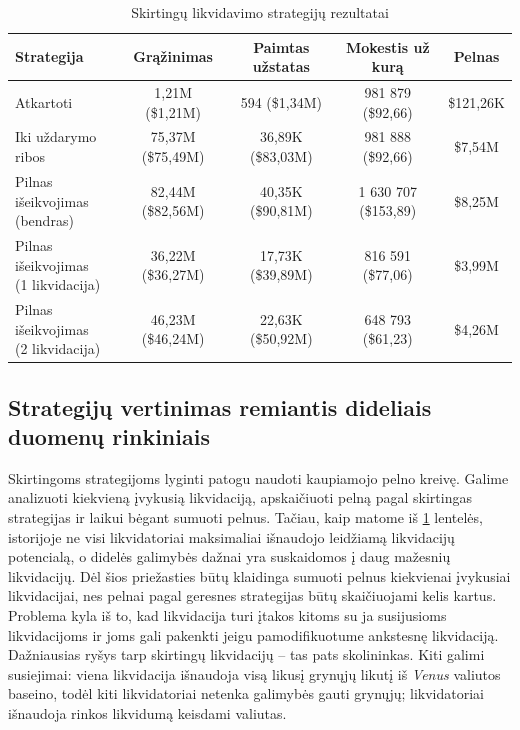 \documentclass{VUMIFPSkursinis}
\begin{document}
\begin{table}[h!]
  \centering
  \begin{tabular}{|l|c|c|c|c|}
  \hline
  \textbf{Strategija}                & \textbf{Grąžinimas}    & \textbf{Paimtas užstatas}   & \textbf{Mokestis už kurą}            & \textbf{Pelnas}              \\ \hline
  Atkartoti                         & 1,21M (\$1,21M)         & 594 (\$1,34M)                & 981 879 (\$92,66)            & \$121,26K                    \\ \hline
  Iki uždarymo ribos                   & 75,37M (\$75,49M)       & 36,89K (\$83,03M)            & 981 888 (\$92,66)            & \$7,54M                      \\ \hline
  \makecell[cl]{Pilnas išeikvojimas \\ (bendras)}                   & 82,44M (\$82,56M)       & 40,35K (\$90,81M)            & 1 630 707 (\$153,89)         & \$8,25M                      \\ \hline
  \makecell[cl]{Pilnas išeikvojimas \\ (1 likvidacija)}                         & 36,22M (\$36,27M)       & 17,73K (\$39,89M)            & 816 591 (\$77,06)            & \$3,99M                      \\ \hline
  \makecell[cl]{Pilnas išeikvojimas \\ (2 likvidacija)}                        & 46,23M (\$46,24M)       & 22,63K (\$50,92M)            & 648 793 (\$61,23)            & \$4,26M                      \\ \hline
  \end{tabular}
  \caption{Skirtingų likvidavimo strategijų rezultatai}
  \label{liquidation_example_comp}
  \end{table}

\subsection{Strategijų vertinimas remiantis dideliais duomenų rinkiniais}
\label{sec:lyginimas_daug}

Skirtingoms strategijoms lyginti patogu naudoti kaupiamojo pelno kreivę. Galime analizuoti kiekvieną įvykusią likvidaciją, apskaičiuoti pelną pagal skirtingas strategijas ir laikui bėgant sumuoti pelnus. Tačiau, kaip matome iš \ref{liquidation_example_comp} lentelės, istorijoje ne visi likvidatoriai maksimaliai išnaudojo leidžiamą likvidacijų potencialą, o didelės galimybės dažnai yra suskaidomos į daug mažesnių likvidacijų. Dėl šios priežasties būtų klaidinga sumuoti pelnus kiekvienai įvykusiai likvidacijai, nes pelnai pagal geresnes strategijas būtų skaičiuojami kelis kartus. Problema kyla iš to, kad likvidacija turi įtakos kitoms su ja susijusioms likvidacijoms ir joms gali pakenkti jeigu pamodifikuotume ankstesnę likvidaciją. Dažniausias ryšys tarp skirtingų likvidacijų – tas pats skolininkas. Kiti galimi susiejimai: viena likvidacija išnaudoja visą likusį grynųjų likutį iš \textit{Venus} valiutos baseino, todėl kiti likvidatoriai netenka galimybės gauti grynųjų; likvidatoriai išnaudoja rinkos likvidumą keisdami valiutas.
\end{document}
